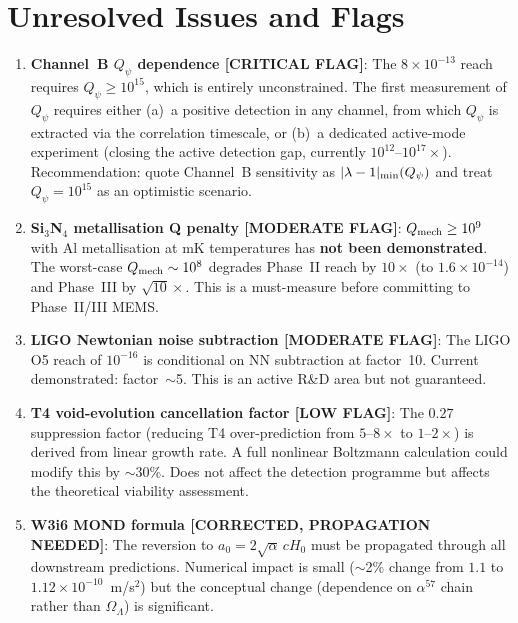 \documentclass[11pt]{article}
\newcommand{\lam}{\lambda}
\newcommand{\ee}[1]{\times 10^{#1}}
\newcommand{\Qpsi}{Q_\psi}
\newcommand{\Qmech}{Q_{\rm mech}}
\newcommand{\lbone}{|\lam - 1|}
\newcommand{\Hzero}{H_0}
\newcommand{\aM}{a_0}
\theoremstyle{definition}
\theoremstyle{remark}
\begin{document}
\section{Unresolved Issues and Flags}
\label{sec:flags}

\begin{enumerate}
\item \textbf{Channel~B $\Qpsi$ dependence [CRITICAL FLAG]}: The
  $8\ee{-13}$ reach requires $\Qpsi \geq 10^{15}$, which is entirely
  unconstrained. The first measurement of $\Qpsi$ requires either
  (a)~a positive detection in any channel, from which $\Qpsi$ is
  extracted via the correlation timescale, or (b)~a dedicated
  active-mode experiment (closing the active detection gap, currently
  $10^{12}$--$10^{17}\times$). Recommendation: quote Channel~B
  sensitivity as $\lbone_{\rm min}(\Qpsi)$ and treat $\Qpsi = 10^{15}$
  as an optimistic scenario.

\item \textbf{Si$_3$N$_4$ metallisation Q penalty [MODERATE FLAG]}:
  $\Qmech \geq 10^9$ with Al metallisation at mK temperatures has
  \textbf{not been demonstrated}. The worst-case $\Qmech \sim 10^8$
  degrades Phase~II reach by $10\times$ (to $1.6\ee{-14}$) and Phase~III
  by $\sqrt{10}\times$. This is a must-measure before committing to
  Phase~II/III MEMS.

\item \textbf{LIGO Newtonian noise subtraction [MODERATE FLAG]}:
  The LIGO O5 reach of $10^{-16}$ is conditional on NN subtraction
  at factor~10. Current demonstrated: factor~$\sim$5. This is an
  active R\&D area but not guaranteed.

\item \textbf{T4 void-evolution cancellation factor [LOW FLAG]}:
  The $0.27$ suppression factor (reducing T4 over-prediction from
  $5$--$8\times$ to $1$--$2\times$) is derived from linear growth rate.
  A full nonlinear Boltzmann calculation could modify this by $\sim$30\%.
  Does not affect the detection programme but affects the theoretical
  viability assessment.

\item \textbf{W3i6 MOND formula [CORRECTED, PROPAGATION NEEDED]}:
  The reversion to $\aM = 2\sqrt{\alpha}\,c\Hzero$ must be propagated
  through all downstream predictions. Numerical impact is small
  ($\sim$2\% change from $1.1$ to $1.12\ee{-10}$~m/s$^2$) but the
  conceptual change (dependence on $\alpha^{57}$ chain rather than
  $\Omega_\Lambda$) is significant.
\end{enumerate}
\end{document}
